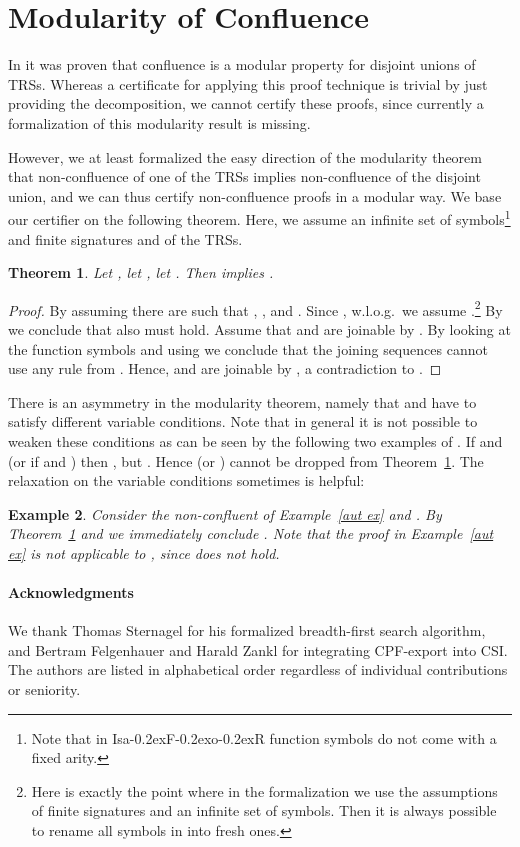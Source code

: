\documentclass[a4paper]{easychair}
\newtheorem{theorem}{Theorem}
\newtheorem{example}[theorem]{Example}
\newcommand\isafor{\textsf{Isa\kern-0.2exF\kern-0.2exo\kern-0.2exR}\xspace}
\newcommand\CSI{\textsf{CSI}\xspace}
\newcommand\rTH[1]{Theorem~\ref{#1}}
\newcommand\rEX[1]{Example~\ref{#1}}
\begin{document}
\section{Modularity of Confluence}

In \cite{Toyama87} it was proven that confluence is a modular property
for disjoint unions of TRSs. Whereas a certificate for applying this proof technique
is trivial by just providing the decomposition, we cannot certify these proofs, since
currently a formalization of this modularity result is missing.

However, we at least formalized the easy direction of the modularity theorem that
non-confluence of one of the TRSs implies non-confluence of the disjoint union,
and we can thus certify non-confluence proofs in a modular way. We base our 
certifier on the following theorem.
Here, we assume an infinite set of symbols\footnote{Note that in \isafor function symbols do not come with a fixed arity.} 
and finite signatures  and  of the TRSs. 


\begin{theorem}
\label{mod}
Let , let , let .
Then  implies .
\end{theorem}

\begin{proof}
By assuming  there are  such that , ,
and . Since , w.l.o.g.\ we assume 
.\footnote{Here is exactly the
point where in the formalization we use the assumptions of finite signatures and an infinite
set of symbols. Then it is always possible to rename all symbols in 
into fresh ones.} By  we conclude that also  must hold. Assume that  and  are joinable by
. By looking at the function symbols and using  we conclude
that the joining sequences cannot use any rule from . Hence,  and  are 
joinable by , a contradiction to . 
\end{proof}

There is an asymmetry in the modularity theorem, namely that  and 
have to satisfy different variable conditions. Note that in general it is not possible
to weaken these conditions as can be seen by the following two examples of \cite[Example 20 and 
example in Section 5.3]{IJCAR}. 
If  and  
(or if 
and ) then , but .
Hence  (or ) cannot be dropped from \rTH{mod}.
The relaxation on the variable conditions sometimes is helpful:

\begin{example}
Consider the non-confluent  of \rEX{aut ex} and .
By \rTH{mod} and  we immediately conclude .
Note that the proof in \rEX{aut ex} is not applicable to , since
 does not hold.
\end{example}

\paragraph{Acknowledgments}
We thank Thomas Sternagel for his formalized breadth-first search algorithm,
and Bertram Felgenhauer and Harald Zankl for integrating 
CPF-export into \CSI. The authors are listed in alphabetical order regardless of individual
contributions or seniority.



\end{document}
